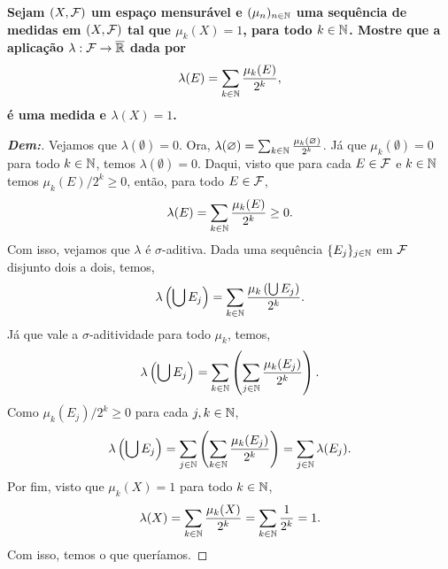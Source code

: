 \biglinend
\newpage 
{}
\myexe{\thedois}
\bigline 
\textbf{
  Sejam $(X, \mathcal F)$ um espaço mensurável e $(\mu_n)_{n \in \mathbb N}$ uma sequência 
  de medidas em $(X, \mathcal F)$ tal que $\mu_k(X) = 1$, para todo $k \in \mathbb N$. 
  Mostre que a aplicação $\lambda: \mathcal F \rightarrow \overline {\mathbb R}$ dada por 
\begin{align*}
  \lambda(E) = \sum_{k \in \mathbb N} \frac{\mu_k(E)}{2^k},
\end{align*}
é uma medida e $\lambda(X) = 1$.
}
\begin{proof}[\textbf{Dem:}] Vejamos que $\lambda(\emptyset) = 0$. 
Ora, $\lambda(\varnothing) = \sum_{k \in \mathbb N} \frac{\mu_k(\varnothing)}{2^k}$. Já que 
  $\mu_k(\emptyset) = 0$ para todo $k \in \mathbb N$, temos $\lambda(\emptyset) = 0$.
  Daqui, visto que para cada $E \in \mathcal F$ e $k \in \mathbb N$ temos $\mu_k(E)/2^k \ge 0$, 
então, para todo $E \in \mathcal F$,
  \begin{align*}
    \lambda(E) = \sum_{k \in \mathbb N} \frac{\mu_k(E)}{2^k} \ge 0.
  \end{align*}
  Com isso, vejamos que $\lambda$ é $\sigma$-aditiva. Dada uma sequência 
  $\{E_j\}_{j \in \mathbb N}$ em $\mathcal F$ disjunto dois a dois, temos, 
  \begin{align*}
    \lambda\left(\bigcup E_j\right) = 
    \sum_{k \in \mathbb N} \frac{\mu_k \left(\bigcup E_j\right)}{2^k}.
  \end{align*}
  Já que vale a $\sigma$-aditividade para todo $\mu_k$, temos,
  \begin{align*}
    \lambda\left(\bigcup E_j\right) = 
    \sum_{k \in \mathbb N}\left(\sum_{j \in \mathbb N} \frac{\mu_k (E_j)}{2^k} \right).
  \end{align*}
  Como $\mu_k(E_j)/2^k \ge 0$ para cada $j,k \in \mathbb N$,
 \begin{align*}
    \lambda\left(\bigcup E_j\right) = 
    \sum_{j \in \mathbb N}\left(\sum_{k \in \mathbb N} \frac{\mu_k (E_j)}{2^k} \right) = 
    \sum_{j \in \mathbb N}\lambda(E_j).
  \end{align*}
 Por fim, visto que $\mu_k(X) = 1$ para todo $k \in \mathbb N$, 
\begin{align*}
  \lambda(X) = \sum_{k \in \mathbb N} \frac{\mu_k(X)}{2^k} 
  = \sum_{k \in \mathbb N} \frac{1}{2^k} = 1. 
\end{align*}
Com isso, temos o que queríamos.
\end{proof}

